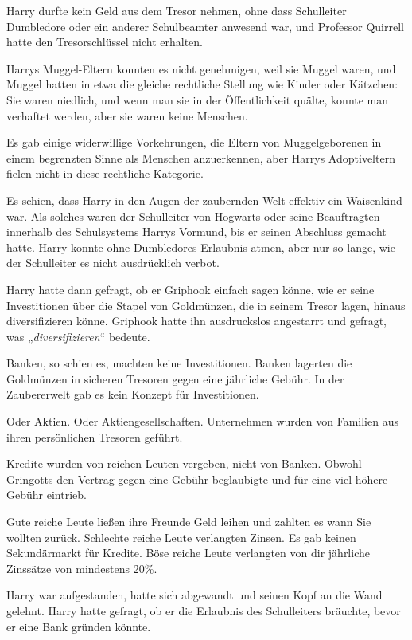 {Harry durfte kein Geld aus dem Tresor nehmen, ohne dass Schulleiter Dumbledore oder ein anderer Schulbeamter anwesend war, und Professor Quirrell hatte den Tresorschlüssel nicht erhalten.

Harrys Muggel-Eltern konnten es nicht genehmigen, weil sie Muggel waren, und Muggel hatten in etwa die gleiche rechtliche Stellung wie Kinder oder Kätzchen: Sie waren niedlich, und wenn man sie in der Öffentlichkeit quälte, konnte man verhaftet werden, aber sie waren keine Menschen.

Es gab einige widerwillige Vorkehrungen, die Eltern von Muggelgeborenen in einem begrenzten Sinne als Menschen anzuerkennen, aber Harrys Adoptiveltern fielen nicht in diese rechtliche Kategorie.

Es schien, dass Harry in den Augen der zaubernden Welt effektiv ein Waisenkind war. Als solches waren der Schulleiter von Hogwarts oder seine Beauftragten innerhalb des Schulsystems Harrys Vormund, bis er seinen Abschluss gemacht hatte. Harry konnte ohne Dumbledores Erlaubnis atmen, aber nur so lange, wie der Schulleiter es nicht ausdrücklich verbot.

Harry hatte dann gefragt, ob er Griphook einfach sagen könne, wie er seine Investitionen über die Stapel von Goldmünzen, die in seinem Tresor lagen, hinaus diversifizieren könne. Griphook hatte ihn ausdruckslos angestarrt und gefragt, was „\emph{diversifizieren}“ bedeute.

Banken, so schien es, machten keine Investitionen. Banken lagerten die Goldmünzen in sicheren Tresoren gegen eine jährliche Gebühr. In der Zaubererwelt gab es kein Konzept für Investitionen.

Oder Aktien. Oder Aktiengesellschaften. Unternehmen wurden von Familien aus ihren persönlichen Tresoren geführt.

Kredite wurden von reichen Leuten vergeben, nicht von Banken. Obwohl Gringotts den Vertrag gegen eine Gebühr beglaubigte und für eine viel höhere Gebühr eintrieb.

Gute reiche Leute ließen ihre Freunde Geld leihen und zahlten es wann Sie wollten zurück. Schlechte reiche Leute verlangten Zinsen. Es gab keinen Sekundärmarkt für Kredite. Böse reiche Leute verlangten von dir jährliche Zinssätze von mindestens 20\%.

Harry war aufgestanden, hatte sich abgewandt und seinen Kopf an die Wand gelehnt. Harry hatte gefragt, ob er die Erlaubnis des Schulleiters bräuchte, bevor er eine Bank gründen könnte.

}
